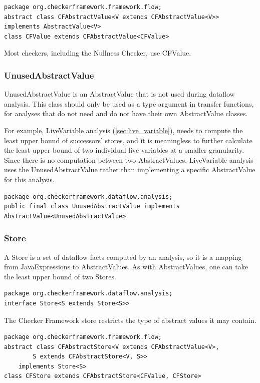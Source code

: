 \begin{verbatim}
package org.checkerframework.framework.flow;
abstract class CFAbstractValue<V extends CFAbstractValue<V>> implements AbstractValue<V>
class CFValue extends CFAbstractValue<CFValue>
\end{verbatim}

Most checkers, including the Nullness Checker, use CFValue.

\subsubsection{UnusedAbstractValue}
\label{sec:unused_abstract_value_class}

UnusedAbstractValue is an AbstractValue that is
not used during dataflow analysis. This class should
only be used as a type argument in transfer functions, for
analyses that do not need and do not have their own AbstractValue classes.

For example, LiveVariable analysis (\autoref{sec:live_variable}),
needs to compute the least upper bound of successors' stores, and
it is meaningless to further calculate the least upper bound of two
individual live variables at a smaller granularity.
Since there is no computation between two AbstractValues, LiveVariable
analysis uses the UnusedAbstractValue rather than
implementing a specific AbstractValue for this analysis.

\begin{verbatim}
package org.checkerframework.dataflow.analysis;
public final class UnusedAbstractValue implements AbstractValue<UnusedAbstractValue>
\end{verbatim}

\subsubsection{Store}
\label{sec:store_classes}

A Store is a set of dataflow facts computed by an analysis, so it is a
mapping from JavaExpressions to AbstractValues.  As with
AbstractValues, one can take the least upper bound of two Stores.

\begin{verbatim}
package org.checkerframework.dataflow.analysis;
interface Store<S extends Store<S>>
\end{verbatim}

The Checker Framework store restricts the type of abstract values it
may contain.

\begin{verbatim}
package org.checkerframework.framework.flow;
abstract class CFAbstractStore<V extends CFAbstractValue<V>,
        S extends CFAbstractStore<V, S>>
    implements Store<S>
class CFStore extends CFAbstractStore<CFValue, CFStore>
\end{verbatim}

